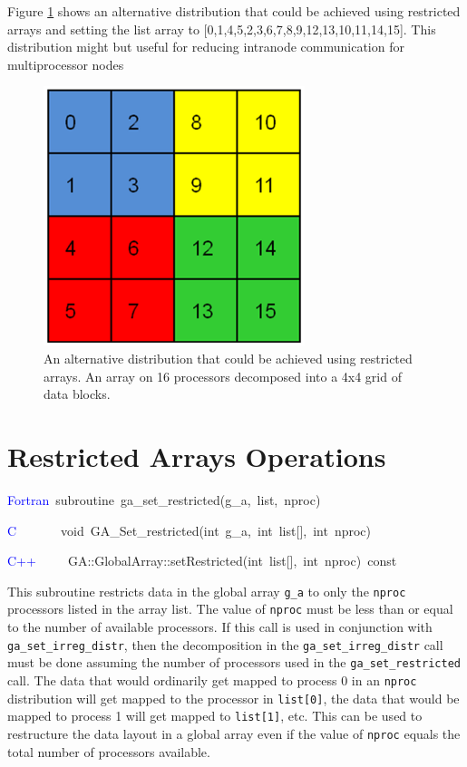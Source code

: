 Figure \ref{fig:GA-16-An-alternative-distribution} shows an alternative
distribution that could be achieved using restricted arrays and setting
the list array to {[}0,1,4,5,2,3,6,7,8,9,12,13,10,11,14,15{]}. This
distribution might but useful for reducing intranode communication
for multiprocessor nodes 

%
\begin{figure}
\begin{centering}
\includegraphics[width=3in]{GAon16ProcessorsAlternative}
\par\end{centering}

\caption{\label{fig:GA-16-An-alternative-distribution}An alternative distribution
that could be achieved using restricted arrays. An array on 16 processors
decomposed into a 4x4 grid of data blocks. }



\end{figure}



\section{Restricted Arrays Operations}

\textcolor{blue}{Fortran}~subroutine~ga\_set\_restricted(g\_a,~list,~nproc)~

\textcolor{blue}{C~}~~~~~~void~GA\_Set\_restricted(int~g\_a,~int~list{[}{]},~int~nproc)~

\textcolor{blue}{C++}~~~~~GA::GlobalArray::setRestricted(int~list{[}{]},~int~nproc)~const

This subroutine restricts data in the global array \texttt{g\_a} to
only the \texttt{nproc} processors listed in the array list. The value
of \texttt{nproc} must be less than or equal to the number of available
processors. If this call is used in conjunction with \texttt{ga\_set\_irreg\_distr},
then the decomposition in the \texttt{ga\_set\_irreg\_distr} call
must be done assuming the number of processors used in the \texttt{ga\_set\_restricted}
call. The data that would ordinarily get mapped to process 0 in an
\texttt{nproc} distribution will get mapped to the processor in \texttt{list{[}0{]}},
the data that would be mapped to process 1 will get mapped to \texttt{list{[}1{]}},
etc. This can be used to restructure the data layout in a global array
even if the value of \texttt{nproc} equals the total number of processors
available. 

